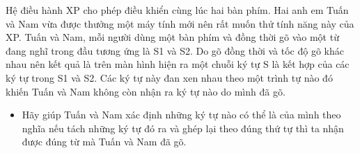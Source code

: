Hệ điều hành XP cho phép điều khiển cùng lúc hai bàn phím. Hai anh em Tuấn và Nam vừa được thưởng một máy tính mới nên rất muốn thử tính năng này của XP. Tuấn và Nam, mỗi người dùng một bàn phím và đồng thời gõ vào một từ đang nghĩ trong đầu tương ứng là S1 và S2. Do gõ đồng thời và tốc độ gõ khác nhau nên kết quả là trên màn hình hiện ra một chuỗi ký tự S là kết hợp của các ký tự trong S1 và S2. Các ký tự này đan xen nhau theo một trình tự nào đó khiến Tuấn và Nam không còn nhận ra ký tự nào do mình đã gõ.  

\begin{itemize}
	\item     Hãy giúp Tuấn và Nam xác định những ký tự nào có thể  là của mình theo nghĩa nếu tách những ký tự đó ra và ghép lại theo đúng thứ tự thì ta nhận được đúng từ mà Tuấn và Nam đã gõ.   
\end{itemize}